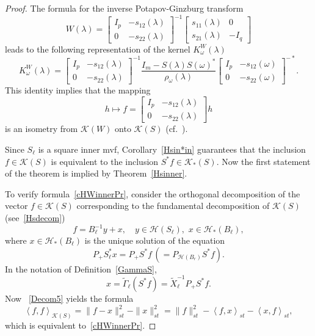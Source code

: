 \documentclass[12pt,twoside,a4paper]{amsart}
\theoremstyle{definition}
\numberwithin{equation}{section}
\begin{document}
\begin{proof}
The formula for the inverse Potapov-Ginzburg transform
\[
 W(\lambda)=\left[\begin{array}{cc}
     I_p & -s_{12}(\lambda) \\
      0 &  -s_{22}({\lambda})
    \end{array}      \right]^{-1}
    \left[\begin{array}{cc}
            s_{11}(\lambda) &       0\\
            s_{21}(\lambda) &       -I_q
    \end{array}      \right]
\]
leads to the following representation of the kernel
$K_\omega^W({\lambda})$
\[
K_\omega^W({\lambda})=\left[\begin{array}{cc}
     I_p & -s_{12}(\lambda) \\
      0 &  -s_{22}({\lambda})
    \end{array}      \right]^{-1}
    \frac{I_m-S({\lambda})S({\omega})^*}{\rho_{\omega}({\lambda})}
    \left[\begin{array}{cc}
     I_p & -s_{12}({\omega}) \\
      0 &  -s_{22}({\omega})
    \end{array}      \right]^{-*}.
\]
This identity implies that the mapping
\[
   h \mapsto f=\left[\begin{array}{cc}
     I_p & -s_{12}(\lambda) \\
      0 &  -s_{22}({\lambda})
    \end{array}      \right]h
\]
is an isometry from ${{\mathcal K}}(W)$ onto ${{\mathcal K}}(S)$ (cf.~\cite{ArovD97}).

Since $S_{\ell}$ is a square inner mvf,
Corollary~\ref{Hsin*in} guarantees that the inclusion $f\in{{\mathcal K}}(S)$ is
equivalent to
the inclusion $S^*f\in{{\mathcal K}}_*(S)$. Now the first statement of the
theorem is implied by Theorem~\ref{Hsinner}.

To verify formula~\eqref{cHWinnerPr}, consider the orthogonal
decomposition of the vector $f\in{{\mathcal K}}(S)$ corresponding to the
fundamental decomposition of ${{\mathcal K}}(S)$ (see~\eqref{Hsdecom})
\begin{equation}\label{Decom5}
    f=B_{\ell}^{-1}y+x,\quad y\in{{\mathcal H}}(S_{\ell}),\,\,x\in
{{\mathcal H}}_*(B_{\ell}),
\end{equation}
where $x\in{{\mathcal H}}_*(B_{\ell})$ is the unique solution of the equation
\begin{equation}\label{eq:Xl}
    P_+S_{\ell}^*x=P_+S^*f\,(=P_{{{\mathcal H}}(B_r)}S^*f).
\end{equation}
In the notation of Definition~\ref{GammaS},
\begin{equation}\label{x6}
    x={{{\widetilde \Gamma} }}_{\ell}(S^*f)={{{\widetilde {X}} }}_\ell^{-1}P_+S^*f.
\end{equation}
Now ~\eqref{Decom5} yields the formula
\[
\left\langle f,f\right\rangle_{{{\mathcal K}}(S)}=\| f-x\|^2_{st}-\|x\|^2_{st}=\|f\|^2_{st}-\left\langle
f,x\right\rangle_{st}-\left\langle
x,f\right\rangle_{st},
\]
which is equivalent to~\eqref{cHWinnerPr}.
\end{proof}
\end{document}
